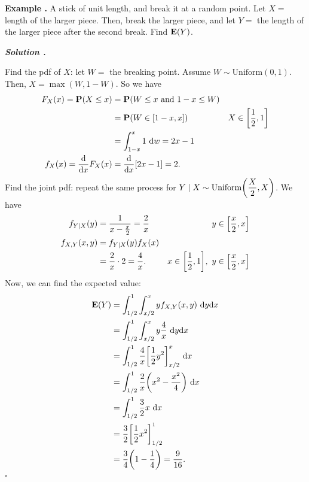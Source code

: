 \documentclass[12pt, a4paper]{article}
\newcounter{index}[subsection]
\newenvironment*{eg}{\begin{framed}\par\noindent\textbf{Example \thesubsection.\stepcounter{index}\theindex}}{\par\end{framed}}
\newcounter{nprf}[subsection]
\newenvironment*{sol}{\par\indent\textbf{\textit{Solution \stepcounter{nprf}\thenprf.}}\par}{\hfill{$\square$}\par}
\def\d{\mathrm{d}}
\def\E{\vb{E}}
\def\P{\vb{P}}
\begin{document}
\begin{eg}
	A stick of unit length, and break it at a random point. Let $X=$ length of the larger piece. Then, break the larger piece, and let $Y=$ the length of the larger piece after the second break. Find $\E(Y)$.
	\begin{sol}
		Find the pdf of $X$: let $W=$ the breaking point. Assume $W\sim\text{Uniform}(0,1)$. Then, $X=\max(W,1-W)$. So we have \begin{align*}F_X(x)=\P(X\leq x)&=\P(W\leq x\text{ and }1-x\leq W)\\&=\P(W\in[1-x,x])&X\in\qty[\dfrac{1}{2},1]\\&=\int_{1-x}^x1\ \d{w}=2x-1\\f_X(x)=\dv{x}F_X(x)&=\dv{x}[2x-1]=2.\end{align*} Find the joint pdf: repeat the same process for $Y\mid X\sim\text{Uniform}\qty(\dfrac{X}{2},X)$. We have \begin{align*}f_{Y\mid X}(y)&=\dfrac{1}{x-\frac{x}{2}}=\dfrac{2}{x}&y\in\qty[\dfrac{x}{2},x]\\f_{X,Y}(x,y)&=f_{Y\mid X}(y)f_X(x)\\&=\dfrac{2}{x}\cdot2=\dfrac{4}{x}.&x\in\qty[\dfrac{1}{2},1],\ y\in\qty[\dfrac{x}{2},x]\end{align*} Now, we can find the expected value: \begin{align*}\E(Y)&=\int_{1/2}^1\int_{x/2}^xyf_{X,Y}(x,y)\ \d{y}\d{x}\\&=\int_{1/2}^1\int_{x/2}^xy\dfrac{4}{x}\ \d{y}\d{x}\\&=\int_{1/2}^1\dfrac{4}{x}\qty[\dfrac{1}{2}y^2]_{x/2}^x\ \d{x}\\&=\int_{1/2}^1\dfrac{2}{x}\qty(x^2-\dfrac{x^2}{4})\ \d{x}\\&=\int_{1/2}^1\dfrac{3}{2}x\ \d{x}\\&=\dfrac{3}{2}\qty[\dfrac{1}{2}x^2]_{1/2}^1\\&=\dfrac{3}{4}\qty(1-\dfrac{1}{4})=\dfrac{9}{16}.\end{align*}
	\end{sol}
\end{eg}
\end{document}
